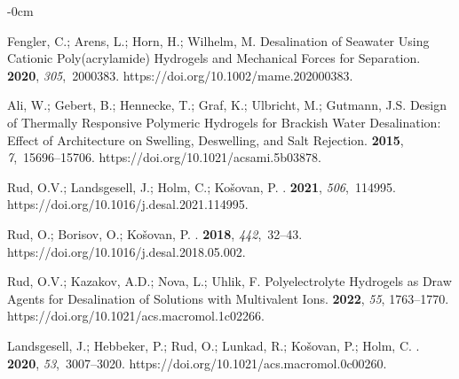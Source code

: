 \documentclass[gels,article,accept,pdftex,moreauthors]{Definitions/mdpi}
\begin{document}
\begin{adjustwidth}{-\extralength}{0cm}
\begin{thebibliography}{999}
Fengler, C.; Arens, L.; Horn, H.; Wilhelm, M.
\newblock Desalination of Seawater Using Cationic Poly(acrylamide) Hydrogels
  and Mechanical Forces for Separation.
 {\bf 2020}, {\em 305},~2000383.
\newblock
  https://doi.org/10.1002/mame.202000383.%

Ali, W.; Gebert, B.; Hennecke, T.; Graf, K.; Ulbricht, M.; Gutmann, J.S.
\newblock Design of Thermally Responsive Polymeric Hydrogels for Brackish Water
  Desalination: Effect of Architecture on Swelling, Deswelling, and Salt
  Rejection.
  {\bf 2015}, {\em 7},~15696--15706.
\newblock
  https://doi.org/10.1021/acsami.5b03878.%

Rud, O.V.; Landsgesell, J.; Holm, C.; Ko{\v s}ovan, P.
.
 {\bf 2021}, {\em 506},~114995.
\newblock
  https://doi.org/10.1016/j.desal.2021.114995.%

Rud, O.; Borisov, O.; Ko{\v s}ovan, P.
.
 {\bf 2018}, {\em 442},~32--43.
\newblock
  https://doi.org/10.1016/j.desal.2018.05.002.%

Rud, O.V.; Kazakov, A.D.; Nova, L.; Uhlik, F.
\newblock Polyelectrolyte Hydrogels as Draw Agents for Desalination of
  Solutions with Multivalent Ions.
 {\bf 2022}, {\em 55}, 1763--1770.
\newblock
  https://doi.org/10.1021/acs.macromol.1c02266.%

Landsgesell, J.; Hebbeker, P.; Rud, O.; Lunkad, R.; Ko{\v s}ovan, P.; Holm, C.
.
 {\bf 2020}, {\em 53},~3007--3020.
\newblock
  https://doi.org/10.1021/acs.macromol.0c00260.%


\end{thebibliography}
\end{adjustwidth}
\end{document}
